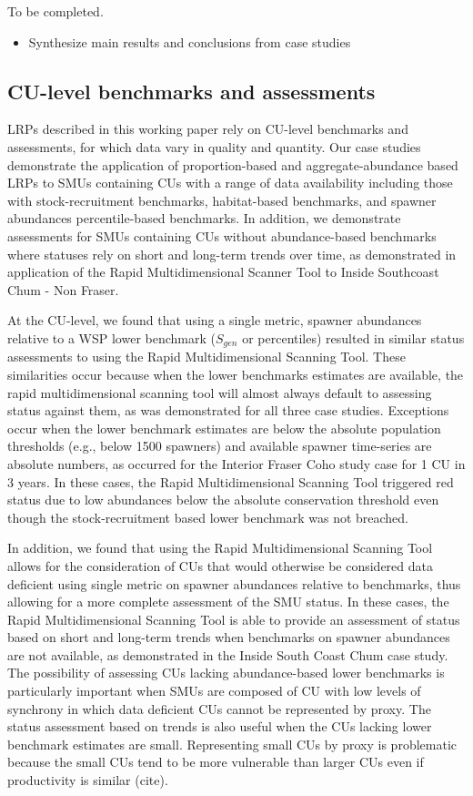 \documentclass[11pt]{book}
\begin{document}
To be completed.
\begin{itemize}

\item
  Synthesize main results and conclusions from case studies
\end{itemize}
\hypertarget{cu-level-benchmarks-and-assessments}{%
\subsection{CU-level benchmarks and assessments}\label{cu-level-benchmarks-and-assessments}}

LRPs described in this working paper rely on CU-level benchmarks and assessments, for which data vary in quality and quantity. Our case studies demonstrate the application of proportion-based and aggregate-abundance based LRPs to SMUs containing CUs with a range of data availability including those with stock-recruitment benchmarks, habitat-based benchmarks, and spawner abundances percentile-based benchmarks. In addition, we demonstrate assessments for SMUs containing CUs without abundance-based benchmarks where statuses rely on short and long-term trends over time, as demonstrated in application of the Rapid Multidimensional Scanner Tool to Inside Southcoast Chum - Non Fraser.

At the CU-level, we found that using a single metric, spawner abundances relative to a WSP lower benchmark (\(S_{gen}\) or percentiles) resulted in similar status assessments to using the Rapid Multidimensional Scanning Tool. These similarities occur because when the lower benchmarks estimates are available, the rapid multidimensional scanning tool will almost always default to assessing status against them, as was demonstrated for all three case studies. Exceptions occur when the lower benchmark estimates are below the absolute population thresholds (e.g., below 1500 spawners) and available spawner time-series are absolute numbers, as occurred for the Interior Fraser Coho study case for 1 CU in 3 years. In these cases, the Rapid Multidimensional Scanning Tool triggered red status due to low abundances below the absolute conservation threshold even though the stock-recruitment based lower benchmark was not breached.

In addition, we found that using the Rapid Multidimensional Scanning Tool allows for the consideration of CUs that would otherwise be considered data deficient using single metric on spawner abundances relative to benchmarks, thus allowing for a more complete assessment of the SMU status. In these cases, the Rapid Multidimensional Scanning Tool is able to provide an assessment of status based on short and long-term trends when benchmarks on spawner abundances are not available, as demonstrated in the Inside South Coast Chum case study. The possibility of assessing CUs lacking abundance-based lower benchmarks is particularly important when SMUs are composed of CU with low levels of synchrony in which data deficient CUs cannot be represented by proxy. The status assessment based on trends is also useful when the CUs lacking lower benchmark estimates are small. Representing small CUs by proxy is problematic because the small CUs tend to be more vulnerable than larger CUs even if productivity is similar (cite).
\end{document}

